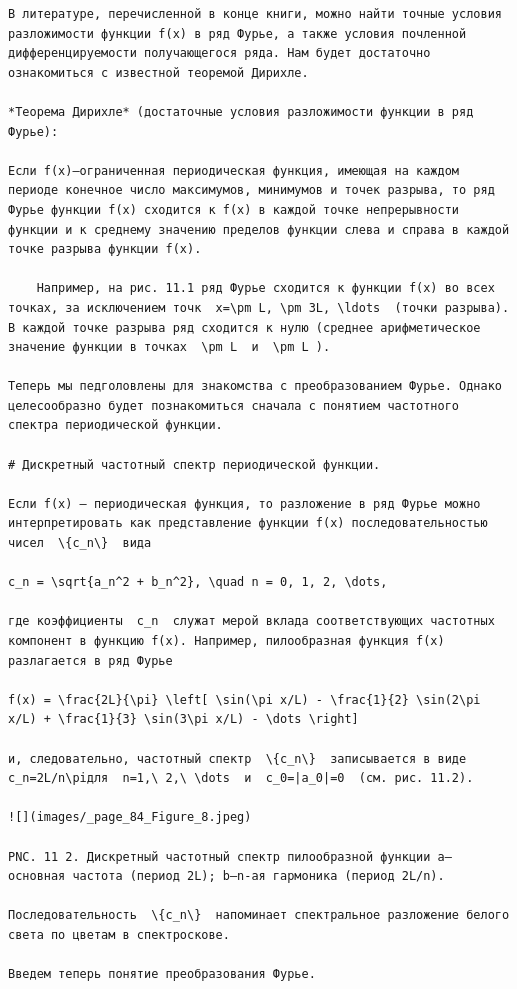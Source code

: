 \documentclass[
  ukrainian,
]{article}
\begin{document}
\begin{verbatim}
В литературе, перечисленной в конце книги, можно найти точные условия разложимости функции f(x) в ряд Фурье, а также условия почленной дифференцируемости получающегося ряда. Нам будет достаточно ознакомиться с известной теоремой Дирихле.

*Теорема Дирихле* (достаточные условия разложимости функции в ряд Фурье):

Если f(x)—ограниченная периодическая функция, имеющая на каждом периоде конечное число максимумов, минимумов и точек разрыва, то ряд Фурье функции f(x) сходится к f(x) в каждой точке непрерывности функции и к среднему значению пределов функции слева и справа в каждой точке разрыва функции f(x).

    Например, на рис. 11.1 ряд Фурье сходится к функции f(x) во всех точках, за исключением точк  x=\pm L, \pm 3L, \ldots  (точки разрыва). В каждой точке разрыва ряд сходится к нулю (среднее арифметическое значение функции в точках  \pm L  и  \pm L ).

Теперь мы педголовлены для знакомства с преобразованием Фурье. Однако целесообразно будет познакомиться сначала с понятием частотного спектра периодической функции.

# Дискретный частотный спектр периодической функции.

Если f(x) — периодическая функция, то разложение в ряд Фурье можно интерпретировать как представление функции f(x) последовательностью чисел  \{c_n\}  вида

c_n = \sqrt{a_n^2 + b_n^2}, \quad n = 0, 1, 2, \dots,

где коэффициенты  c_n  служат мерой вклада соответствующих частотных компонент в функцию f(x). Например, пилообразная функция f(x) разлагается в ряд Фурье

f(x) = \frac{2L}{\pi} \left[ \sin(\pi x/L) - \frac{1}{2} \sin(2\pi x/L) + \frac{1}{3} \sin(3\pi x/L) - \dots \right]

и, следовательно, частотный спектр  \{c_n\}  записывается в виде  c_n=2L/n\piдля  n=1,\ 2,\ \dots  и  c_0=|a_0|=0  (см. рис. 11.2).

![](images/_page_84_Figure_8.jpeg)

PNC. 11 2. Дискретный частотный спектр пилообразной функции a— основная частота (период 2L); b—n-ая гармоника (период 2L/n).

Последовательность  \{c_n\}  напоминает спектральное разложение белого света по цветам в спектроскове.

Введем теперь понятие преобразования Фурье.


\end{verbatim}
\end{document}
